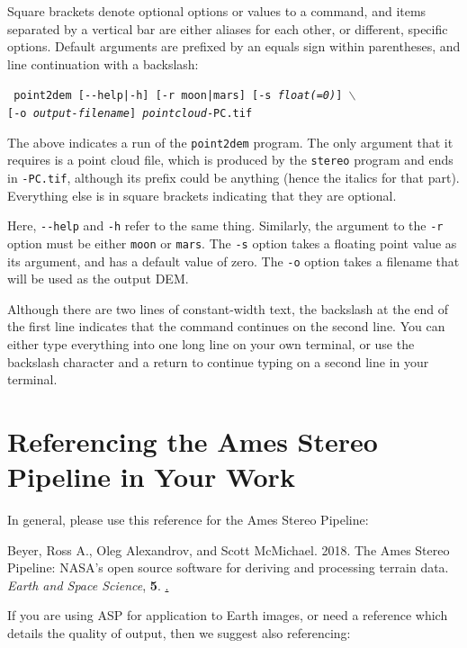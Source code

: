 Square brackets denote optional options or values to a command, and
items separated by a vertical bar are either aliases for each other, or
different, specific options.  Default arguments are prefixed by an equals
sign within parentheses, and line continuation with a backslash:

\texttt{  point2dem [-\/-help|-h] [-r moon|mars] [-s \textit{float(=0)}] $\backslash$ } \\
\hspace*{6em}\texttt{[-o \textit{output-filename}] \textit{pointcloud}-PC.tif}

The above indicates a run of the \texttt{point2dem} program.  The
only argument that it requires is a point cloud file, which is
produced by the \texttt{stereo} program and ends in \texttt{-PC.tif},
although its prefix could be anything (hence the italics for that
part).  Everything else is in square brackets indicating that they
are optional.

Here, \texttt{-\/-help} and \texttt{-h} refer to the same
thing. Similarly, the argument to the \texttt{-r} option must be either
\texttt{moon} or \texttt{mars}.  The \texttt{-s} option takes a floating
point value as its argument, and has a default value of zero.  The
\texttt{-o} option takes a filename that will be used as the output
\ac{DEM}.

Although there are two lines of constant-width text, the backslash at
the end of the first line indicates that the command continues on the
second line. You can either type everything into one long line on your
own terminal, or use the backslash character and a return to continue
typing on a second line in your terminal.


\section{Referencing the Ames Stereo Pipeline in Your Work}

In general, please use this reference for the Ames Stereo Pipeline:

\begin{description}
		\item Beyer, Ross A., Oleg Alexandrov, and Scott McMichael. 2018. The Ames Stereo Pipeline: NASA's open source software for deriving and processing terrain data. \textit{Earth and Space Science}, \textbf{5}. \href{https://doi.org/10.1029/2018EA000409}.
\end{description}

If you are using ASP for application to Earth images, or need a reference which details the quality 
of output, then we suggest also referencing:

